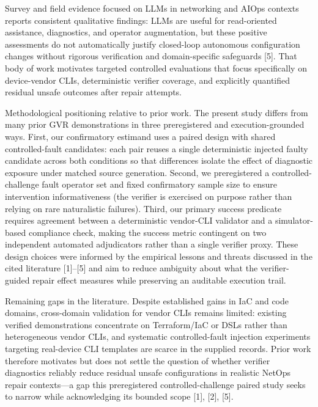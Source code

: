 \documentclass[conference]{IEEEtran}
\begin{document}
Survey and field evidence focused on LLMs in networking and AIOps contexts reports consistent qualitative findings: LLMs are useful for read-oriented assistance, diagnostics, and operator augmentation, but these positive assessments do not automatically justify closed-loop autonomous configuration changes without rigorous verification and domain-specific safeguards [5]. That body of work motivates targeted controlled evaluations that focus specifically on device-vendor CLIs, deterministic verifier coverage, and explicitly quantified residual unsafe outcomes after repair attempts.

Methodological positioning relative to prior work. The present study differs from many prior GVR demonstrations in three preregistered and execution-grounded ways. First, our confirmatory estimand uses a paired design with shared controlled-fault candidates: each pair reuses a single deterministic injected faulty candidate across both conditions so that differences isolate the effect of diagnostic exposure under matched source generation. Second, we preregistered a controlled-challenge fault operator set and fixed confirmatory sample size to ensure intervention informativeness (the verifier is exercised on purpose rather than relying on rare naturalistic failures). Third, our primary success predicate requires agreement between a deterministic vendor-CLI validator and a simulator-based compliance check, making the success metric contingent on two independent automated adjudicators rather than a single verifier proxy. These design choices were informed by the empirical lessons and threats discussed in the cited literature [1]--[5] and aim to reduce ambiguity about what the verifier-guided repair effect measures while preserving an auditable execution trail.

Remaining gaps in the literature. Despite established gains in IaC and code domains, cross-domain validation for vendor CLIs remains limited: existing verified demonstrations concentrate on Terraform/IaC or DSLs rather than heterogeneous vendor CLIs, and systematic controlled-fault injection experiments targeting real-device CLI templates are scarce in the supplied records. Prior work therefore motivates but does not settle the question of whether verifier diagnostics reliably reduce residual unsafe configurations in realistic NetOps repair contexts---a gap this preregistered controlled-challenge paired study seeks to narrow while acknowledging its bounded scope [1], [2], [5].
\end{document}
